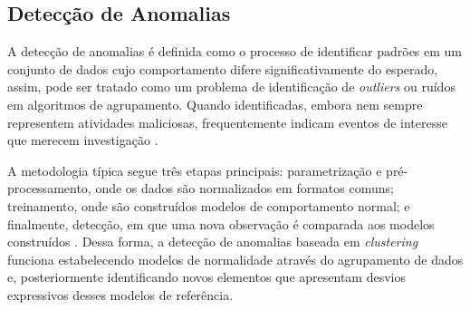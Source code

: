 \subsection{Detecção de Anomalias}

A detecção de anomalias é definida como o processo de identificar padrões em um conjunto de dados cujo comportamento difere significativamente do esperado, assim, pode ser tratado como um problema de identificação de \textit{outliers} ou ruídos em algoritmos de agrupamento. Quando identificadas, embora nem sempre representem atividades maliciosas, frequentemente indicam eventos de interesse que merecem investigação \cite{anomaly, cluster2}.

A metodologia típica segue três etapas principais: parametrização e pré-processamento, onde os dados são normalizados em formatos comuns; treinamento, onde são construídos modelos de comportamento normal; e finalmente, detecção, em que uma nova observação é comparada aos modelos construídos \cite{anomaly}. Dessa forma, a detecção de anomalias baseada em \textit{clustering} funciona estabelecendo modelos de normalidade através do agrupamento de dados e, posteriormente identificando novos elementos que apresentam desvios expressivos desses modelos de referência.